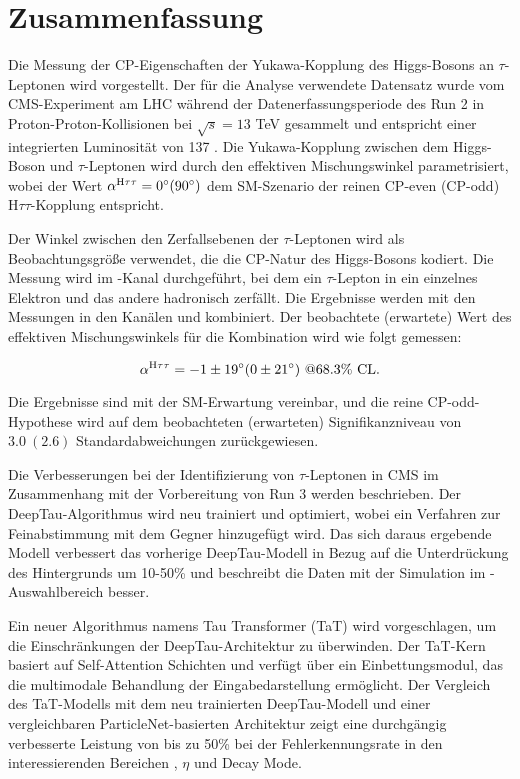 \thispagestyle{empty}
\vspace{-3cm}
\section*{\centering Zusammenfassung}
\noindent

Die Messung der CP-Eigenschaften der Yukawa-Kopplung des Higgs-Bosons an $\tau$-Leptonen wird vorgestellt. Der für die Analyse verwendete Datensatz wurde vom CMS-Experiment am LHC während der Datenerfassungsperiode des Run 2 in Proton-Proton-Kollisionen bei $\sqrt{s}=13$ TeV gesammelt und entspricht einer integrierten Luminosität von 137 \ifb. Die Yukawa-Kopplung zwischen dem Higgs-Boson und $\tau$-Leptonen wird durch den effektiven Mischungswinkel \mixa parametrisiert, wobei der Wert $\alpha^{\text{H}\tau\tau} = 0^\circ (90^\circ)$ dem SM-Szenario der reinen CP-even (CP-odd) $\text{H}\tau\tau$-Kopplung entspricht. 

Der Winkel zwischen den Zerfallsebenen der $\tau$-Leptonen wird als Beobachtungsgröße verwendet, die die CP-Natur des Higgs-Bosons kodiert. Die Messung wird im \et-Kanal durchgeführt, bei dem ein $\tau$-Lepton in ein einzelnes Elektron und das andere hadronisch zerfällt. Die Ergebnisse werden mit den Messungen in den Kanälen \mt und \tata kombiniert. Der beobachtete (erwartete) Wert des effektiven Mischungswinkels für die Kombination wird wie folgt gemessen:

\begin{equation}
    \alpha^{\text{H}\tau\tau} = -1 \pm 19^\circ (0 \pm 21^\circ) ~@68.3\% \text{ CL}.
\end{equation}

Die Ergebnisse sind mit der SM-Erwartung vereinbar, und die reine CP-odd-Hypothese wird auf dem beobachteten (erwarteten) Signifikanzniveau von $3.0 ~(2.6)$ Standardabweichungen zurückgewiesen.

Die Verbesserungen bei der Identifizierung von $\tau$-Leptonen in CMS im Zusammenhang mit der Vorbereitung von Run 3 werden beschrieben. Der DeepTau-Algorithmus wird neu trainiert und optimiert, wobei ein Verfahren zur Feinabstimmung mit dem Gegner hinzugefügt wird. Das sich daraus ergebende Modell verbessert das vorherige DeepTau-Modell in Bezug auf die Unterdrückung des Hintergrunds um 10-50\% und beschreibt die Daten mit der Simulation im \htt-Auswahlbereich besser. 

Ein neuer Algorithmus namens Tau Transformer (TaT) wird vorgeschlagen, um die Einschränkungen der DeepTau-Architektur zu überwinden. Der TaT-Kern basiert auf Self-Attention Schichten und verfügt über ein Einbettungsmodul, das die multimodale Behandlung der Eingabedarstellung ermöglicht. Der Vergleich des TaT-Modells mit dem neu trainierten DeepTau-Modell und einer vergleichbaren ParticleNet-basierten Architektur zeigt eine durchgängig verbesserte Leistung von bis zu 50\% bei der Fehlerkennungsrate in den interessierenden Bereichen \pt, $\eta$ und Decay Mode.   

